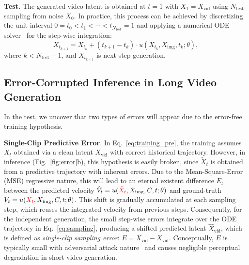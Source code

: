 \documentclass{article} %
\newcommand\vid{\mathrm{vid}}
\newcommand\img{\mathrm{img}}
\newcommand{\err}{E}
\begin{document}
\textbf{Test.} The generated video latent is obtained at $t=1$ with ${X}_{1}= X_\vid$ using $N_{\mathrm{test}}$ sampling from noise $X_0$. In practice, this process can be achieved by discretizing the unit interval $0 = t_0 < t_1 < \cdots < t_{N_{\mathrm{test}}} = 1$ and applying a numerical ODE solver~\citep{esser2024sd3} for the step-wise integration:
\begin{equation}\label{eq:sampling}
X_{t_{k+1}} = X_{t_k} + (t_{k+1} - t_k)\cdot u(X_{t_k}, X_\img, t_k; \theta),
\end{equation}
where $k<N_{\mathrm{test}}-1$, and $X_{t_{k+1}}$ is next-step generation.


\subsection{Error-Corrupted Inference in Long Video Generation}\vspace{-4pt}

In the test, we uncover that two types of errors will appear due to the error-free training hypothesis.

\textbf{Single-Clip Predictive Error}. In Eq.~\ref{eq:training_pre}, the training assumes $X_t$ obtained via a clean latent $X_\vid$ with correct historical trajectory. However, in inference (Fig.~\ref{fig:error}b), this hypothesis is easily broken, since $\tilde{X}_t$ is obtained from a predictive trajectory with inherent errors. Due to the Mean-Square-Error (MSE) regressive nature, this will lead to an eternal existent difference $E_{t}$ between the predicted velocity $\hat{V}_t = u({\color{red}{\tilde{X}_t}}, X_\img, C, t; \theta)$ and ground-truth $V_t=u({\color{red}{X_t}}, X_\img, C, t; \theta)$. This shift is gradually accumulated at each sampling step, which reuses the integrated velocity from previous steps. Consequently, for the independent generation, the small step-wise errors integrate over the ODE trajectory in Eq.~\ref{eq:sampling}, producing a shifted predicted latent $\hat{X}_\vid$, which is defined as \emph{single-clip sampling error}: $\err = \hat{X}_\vid - X_\vid $. Conceptually, $\err$ is typically small with adversarial attack nature~\citep{goodfellow2014explaining} and causes negligible perceptual degradation in short video generation.
\end{document}
